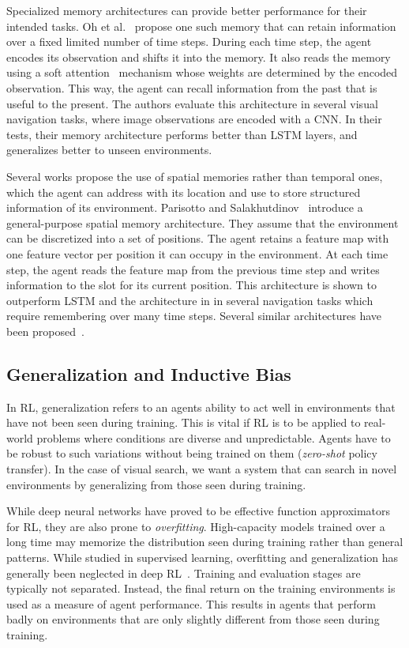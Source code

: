 Specialized memory architectures can provide better performance for their intended tasks.
Oh et al.~\cite{oh_minecraft_2016} propose one such memory that can retain information over a fixed limited number of time steps.
During each time step, the agent encodes its observation and shifts it into the memory.
It also reads the memory using a soft attention~\cite{bahdanau_attention_2016} mechanism whose weights are determined by the encoded observation.
This way, the agent can recall information from the past that is useful to the present.
The authors evaluate this architecture in several visual navigation tasks, where image observations are encoded with a CNN.
In their tests, their memory architecture performs better than LSTM layers, and generalizes better to unseen environments.

Several works propose the use of spatial memories rather than temporal ones, which the agent can address with its location and use to store structured information of its environment.
Parisotto and Salakhutdinov~\cite{parisotto_salakhutdinov_2017} introduce a general-purpose spatial memory architecture.
They assume that the environment can be discretized into a set of positions.
The agent retains a feature map with one feature vector per position it can occupy in the environment.
At each time step, the agent reads the feature map from the previous time step and writes information to the slot for its current position.
This architecture is shown to outperform LSTM and the architecture in \cite{oh_minecraft_2016} in several navigation tasks which require remembering over many time steps. Several similar architectures have been proposed~\cite{henriques_vedaldi_2018,gupta_cognitive_2019,chaplot_semantic_2020}.

\subsection{Generalization and Inductive Bias}

In RL, generalization refers to an agents ability to act well in environments that have not been seen during training.
This is vital if RL is to be applied to real-world problems where conditions are diverse and unpredictable.
Agents have to be robust to such variations without being trained on them (\textit{zero-shot} policy transfer).
In the case of visual search, we want a system that can search in novel environments by generalizing from those seen during training.

While deep neural networks have proved to be effective function approximators for RL, they are also prone to \textit{overfitting}.
High-capacity models trained over a long time may memorize the distribution seen during training rather than general patterns.
While studied in supervised learning, overfitting and generalization has generally been neglected in deep RL~\cite{kirk_survey_2022}.
Training and evaluation stages are typically not separated.
Instead, the final return on the training environments is used as a measure of agent performance.
This results in agents that perform badly on environments that are only slightly different from those seen during training.

